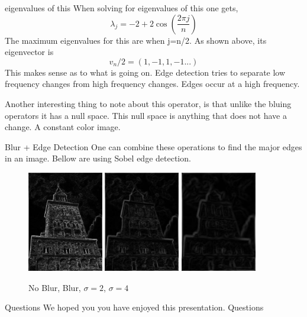 \documentclass{beamer}
\begin{document}
\begin{frame}{eigenvalues of this}
When solving for eigenvalues of this one gets,
$$ \lambda_j = -2 + 2\cos(\dfrac{2\pi j}{n}) $$
The maximum eigenvalues for this are when j=n/2. As shown above, its eigenvector is $$v_n/2= (1,-1,1,-1...)$$
This makes sense as to what is going on. Edge detection tries to separate low frequency changes from high frequency changes. Edges occur at a high frequency. 

Another interesting thing to note about this operator, is that unlike the bluing operators it has a null space. This null space is anything that does not have a change. A constant color image.

\end{frame}


\begin{frame}{Blur + Edge Detection}
One can combine these operations to find the major edges in an image. Bellow are using Sobel edge detection. 


\begin{figure}[ht]
\includegraphics[width=1.3in]{churchout.jpg}
\hspace{.1in} 
\includegraphics[width=1.3in]{churchoutbluredge.jpg}
\hspace{.1in}
\includegraphics[width=1.3in]{churchoutblur2edge.jpg}
\hspace{.1in}
\caption{No Blur, Blur, $\sigma = 2$, $\sigma = 4$}
\end{figure}
\end{frame}

\begin{frame}{Questions}
We hoped you you have enjoyed this presentation.
Questions
\end{frame}
\end{document}
